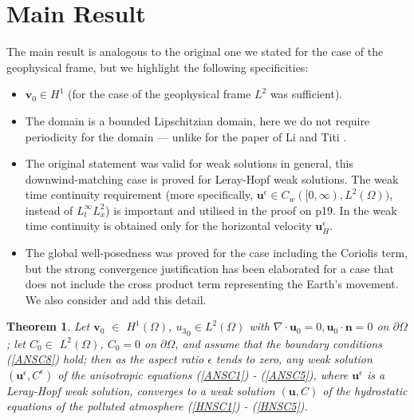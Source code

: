 \documentclass[11pt]{article}
\newtheorem{theorem}{Theorem}
\begin{document}
\section{Main Result} \label{weakformulationmainresult}

The main result is analogous to the original one we stated for the case of the geophysical frame, but we highlight the following specificities:

\begin{itemize}

  \item $\mathbf{v}_0 \in H^1$ (for the case of the geophysical frame $L^2$ was sufficient).
  \item The domain is a bounded Lipschitzian domain, here we do not require periodicity for the domain --- unlike for the paper of Li and Titi \cite{li2019primitive}.
  \item The original statement was valid for weak solutions in general, this downwind-matching case is proved for Leray-Hopf weak solutions. The weak time continuity requirement (more specifically, $\mathbf{u}^\epsilon \in C_w( [ 0,\infty), L^2 (\Omega))$, instead of $L^\infty_t L^2_x$) is important and utilised in the proof on p19. In \cite{azerad2001mathematical} the weak time continuity is obtained only for the horizontal velocity $\mathbf{u}^\epsilon_H.$
  \item The global well-posedness was proved for the case including the Coriolis term, but the strong convergence justification has been elaborated for a case that does not include the cross product term representing the Earth's movement. We also consider and add this detail.

\end{itemize}

\begin{theorem} \label{maintheorem}
  Let $\mathbf{v}_0$ $\in$ $H^1 (\Omega)$, ${u_3}_0 \in L^2(\Omega)$ with $\nabla \cdot \mathbf{u}_0 = 0, \mathbf{u}_0 \cdot \mathbf{n} = 0$ on $\partial \Omega$; let $C_0 \in$ $L^2 (\Omega)$, $C_0 = 0$ on $ \partial \Omega$, and assume that the boundary conditions (\ref{ANSC8}) hold; then as the aspect ratio $\epsilon$ tends to zero, any  weak solution $(\mathbf{u}^\epsilon, C^\epsilon)$ of the anisotropic equations (\ref{ANSC1}) - (\ref{ANSC5}), where $\mathbf{u}^\epsilon$ is a Leray-Hopf weak solution, converges to a weak solution $(\mathbf{u}, C)$ of the hydrostatic equations of the polluted atmosphere (\ref{HNSC1}) - (\ref{HNSC5}).
\end{theorem}
\end{document}
